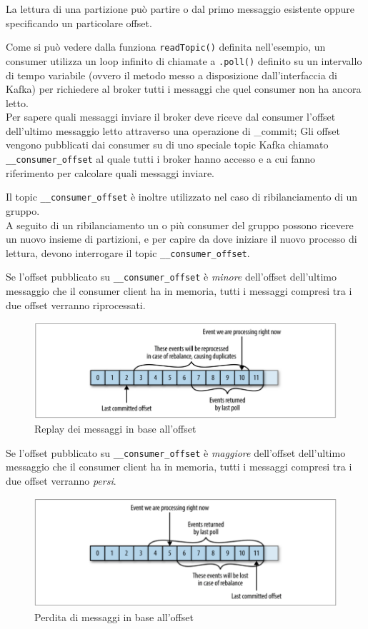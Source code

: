 \documentclass[]{article}
\begin{document}
La lettura di una partizione può partire o dal primo messaggio esistente
oppure specificando un particolare offset.

Come si può vedere dalla funziona \texttt{readTopic()} definita
nell'esempio, un consumer utilizza un loop infinito di chiamate a
\texttt{.poll()} definito su un intervallo di tempo variabile (ovvero il
metodo messo a disposizione dall'interfaccia di Kafka) per richiedere al
broker tutti i messaggi che quel consumer non ha ancora letto.\\
Per sapere quali messaggi inviare il broker deve riceve dal consumer
l'offset dell'ultimo messaggio letto attraverso una operazione di
\_commit; Gli offset vengono pubblicati dai consumer su di uno speciale
topic Kafka chiamato \texttt{\_\_consumer\_offset} al quale tutti i
broker hanno accesso e a cui fanno riferimento per calcolare quali
messaggi inviare.

Il topic \texttt{\_\_consumer\_offset} è inoltre utilizzato nel caso di
ribilanciamento di un gruppo.\\
A seguito di un ribilanciamento un o più consumer del gruppo possono
ricevere un nuovo insieme di partizioni, e per capire da dove iniziare
il nuovo processo di lettura, devono interrogare il topic
\texttt{\_\_consumer\_offset}.

Se l'offset pubblicato su \texttt{\_\_consumer\_offset} è \emph{minore}
dell'offset dell'ultimo messaggio che il consumer client ha in memoria,
tutti i messaggi compresi tra i due offset verranno riprocessati.

\begin{figure}
\centering
\includegraphics[width=1.00000\textwidth]{../images/early-offset.png}
\caption{Replay dei messaggi in base all'offset \label{figure_3}}
\end{figure}

Se l'offset pubblicato su \texttt{\_\_consumer\_offset} è
\emph{maggiore} dell'offset dell'ultimo messaggio che il consumer client
ha in memoria, tutti i messaggi compresi tra i due offset verranno
\emph{persi}.

\begin{figure}
\centering
\includegraphics[width=1.00000\textwidth]{../images/late-offset.png}
\caption{Perdita di messaggi in base all'offset \label{figure_3}}
\end{figure}
\end{document}

